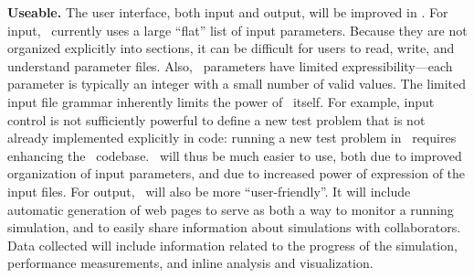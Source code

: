 \documentclass[11pt]{article}
\begin{document}




    \textbf{Useable.}  The user interface, both input and output, will
    be improved in \cello.  For input, \enzo\ currently uses a large
    ``flat'' list of input parameters.  Because they are not organized
    explicitly into sections, it can be difficult for users to read,
    write, and understand parameter files.
%
    Also, \enzo\ parameters have limited expressibility---each
    parameter is typically an integer with a small number of valid
    values.
%
    The limited input file grammar inherently limits the power of
    \enzo\ itself.  For example, input control is not sufficiently
    powerful to define a new test problem that is not already
    implemented explicitly in code: running a new test problem in
    \enzo\ requires enhancing the \enzo\ codebase.  \cello\ will thus
    be much easier to use, both due to improved organization of input
    parameters, and due to increased power of expression of the input
    files.  For output, \cello\ will also be more ``user-friendly''.
    It will include automatic generation of web pages to serve as both
    a way to monitor a running simulation, and to easily share
    information about simulations with collaborators.  Data collected
    will include information related to the progress of the
    simulation, performance measurements, and inline analysis and
    visualization.


\end{document}

